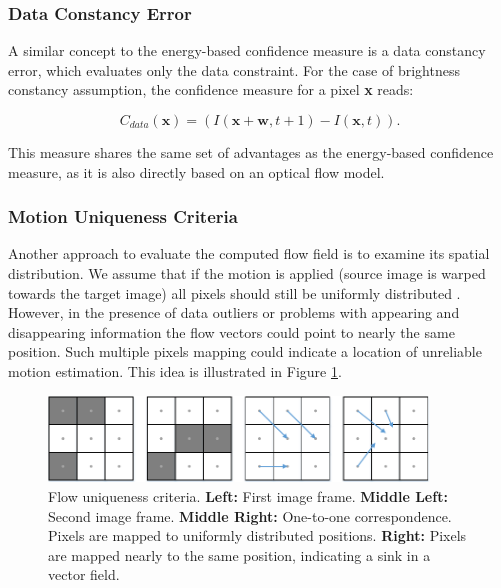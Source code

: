 \subsubsection{Data Constancy Error}
\label{data_constancy_error}

A similar concept to the energy-based confidence measure is a data constancy error, which evaluates only the data constraint. For the case of brightness constancy assumption, the confidence measure for a pixel \textbf{x} reads:

$$ C_{data}(\textbf{x}) = (I(\textbf{x} + \textbf{w}, t+1) - I(\textbf{x}, t)). $$

This measure shares the same set of advantages as the energy-based confidence measure, as it is also directly based on an optical flow model.


\subsubsection{Motion Uniqueness Criteria}
\label{motion_uniqueness_criteria}

Another approach to evaluate the computed flow field is to examine its spatial distribution. 
We assume that if the motion is applied (source image is warped towards the target image) all pixels should still be uniformly distributed \cite{Brown03, ErshovThesis, Xu10}. However, in the presence of data outliers or problems with appearing and disappearing information the flow vectors could point to nearly the same position. Such multiple pixels mapping could indicate a location of unreliable motion estimation. This idea is illustrated in Figure \ref{fig:4_uniqueness}. 

\begin{figure}[ht]
  \centerline{
    \mbox{\includegraphics[width=0.9\textwidth]{figures/fig_22_p42.pdf}} 
  }
  \caption[Flow Uniqueness.]{Flow uniqueness criteria. \textbf{Left:} First image frame. \textbf{Middle Left:} Second image frame. \textbf{Middle Right:} One-to-one correspondence. Pixels are mapped to uniformly distributed positions. \textbf{Right:} Pixels are mapped nearly to the same position, indicating a  sink in a vector field.}
  \label{fig:4_uniqueness}
\end{figure}

